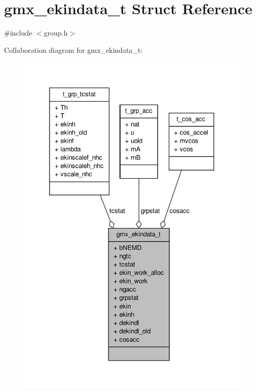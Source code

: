 \hypertarget{structgmx__ekindata__t}{\section{gmx\-\_\-ekindata\-\_\-t \-Struct \-Reference}
\label{structgmx__ekindata__t}
}


{\ttfamily \#include $<$group.\-h$>$}



\-Collaboration diagram for gmx\-\_\-ekindata\-\_\-t\-:
\nopagebreak
\begin{figure}[H]
\begin{center}
\leavevmode
\includegraphics[width=336pt]{structgmx__ekindata__t__coll__graph}
\end{center}
\end{figure}
